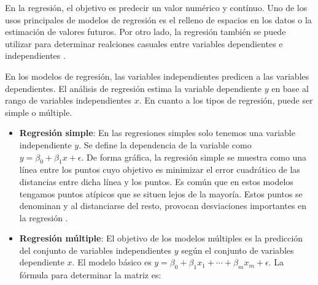 En la regresión, el objetivo es predecir un valor numérico y contínuo. Uno de los usos principales de modelos de regresión es el relleno de espacios en los datos o la estimación de valores futuros. Por otro lado, la regresión también se puede utilizar para determinar realciones casuales entre variables dependientes e independientes .

En los modelos de regresión, las variables independientes predicen a las variables dependientes. El análisis de regresión estima la variable dependiente $y$ en base al rango de variables independientes $x$. En cuanto a los tipos de regresión, puede ser simple o múltiple.

\begin{itemize}
  \item \textbf{Regresión simple}: En las regresiones simples solo tenemos una variable independiente $y$. Se define la dependencia de la variable como $y = \beta_0 + \beta_1 x + \epsilon$. De forma gráfica, la regresión simple se muestra como una línea entre los puntos cuyo objetivo es minimizar el error cuadrático de las distancias entre dicha línea y los puntos. Es común que en estos modelos tengamos puntos atípicos que se situen lejos de la mayoría. Estos puntos se denominan  y al distanciarse del resto, provocan desviaciones importantes en la regresión .
  \item \textbf{Regresión múltiple}: El objetivo de los modelos múltiples es la predicción del conjunto de variables independientes $y$ según el conjunto de variables dependiente $x$. El modelo básico es $y = \beta_0 + \beta_1 x_1 + \cdots + \beta_m x_m + \epsilon$. La fórmula para determinar la matriz es:


\end{itemize}
